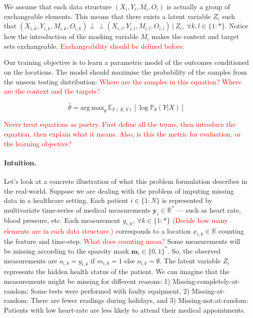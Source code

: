 \documentclass[a4paper,12pt,twoside,openright]{report}
\newcommand{\crit}[1]{\textcolor{red}{#1}}
\newcommand{\ind}{\perp\!\!\!\!\perp}
\begin{document}
We assume that each data structure $(X_i, Y_i, M_i, O_i)$ is actually a group of exchangeable elements. This means that there exists a latent variable $Z_i$ such that $(X_{i,k}, Y_{i,k}, M_{i,k}, O_{i,k}) \ind (X_{i,l}, Y_{i,l}, M_{i,l}, O_{i,l}) ~ | ~ Z_i, ~ \forall k,l \in \{1:*\}$. Notice how the introduction of the masking variable $M_i$ makes the context and target sets exchangeable. \crit{Exchangeability should be defined before.}

Our training objective is to learn a parametric model of the outcomes conditioned on the locations. The model should maximise the probability of the samples from the unseen testing distribution: \crit{Where are the samples in this equation? Where are the context and the targets?}

\begin{equation*}
    \hat{\theta} = \mathrm{arg~max}_{\theta} ~ \mathbb{E}_{\mathbb{P} (X, Y)} [\log \mathbb{P}_{\theta} (Y | X)]    
\end{equation*}

\crit{Never treat equations as poetry. First define all the terms, then introduce the equation, then explain what it means. Also, is this the metric for evaluation, or the learning objective?}

\paragraph{Intuition.} Let's look at a concrete illustration of what this problem formulation describes in the real-world. Suppose we are dealing with the problem of imputing missing data in a healthcare setting. Each patient $i \in \{1:N\}$ is represented by multivariate time-series of medical measurements $\mathbf{y}_i \in \mathbb{R}^{*}$ --- such as heart rate, blood pressure, etc. Each measurement $y_{i,k}, ~ \forall k \in \{1:*\}$ \crit{(Decide how many elements are in each data structure.)} corresponds to a location $x_{i,k} \in \mathbb{R}$ counting the feature and time-step. \crit{What does counting mean?} Some measurements will be missing according to the sparsity mask $\mathbf{m}_i \in \{0,1\}^*$. So, the observed measurements are $o_{i,k} = y_{i,k}$ if $m_{i,k} = 1$ else $o_{i,k} = \emptyset$.      
The latent variable $Z_i$ represents the hidden health status of the patient. We can imagine that the measurements might be missing for different reasons: 1) Missing-completely-at-random: Some tests were performed with faulty equipment, 2) Missing-at-random: There are fewer readings during holidays, and 3) Missing-not-at-random: Patients with low heart-rate are less likely to attend their medical appointments.
\end{document}
